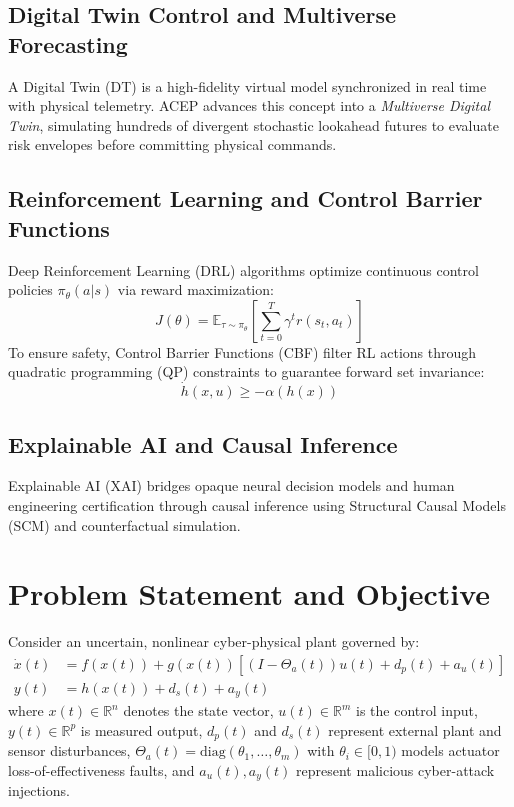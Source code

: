 \documentclass[journal,twocolumn]{IEEEtran}
\begin{document}
\subsection{Digital Twin Control and Multiverse Forecasting}
A Digital Twin (DT) is a high-fidelity virtual model synchronized in real time with physical telemetry. ACEP advances this concept into a \textit{Multiverse Digital Twin}, simulating hundreds of divergent stochastic lookahead futures to evaluate risk envelopes before committing physical commands.

\subsection{Reinforcement Learning and Control Barrier Functions}
Deep Reinforcement Learning (DRL) algorithms optimize continuous control policies $\pi_\theta(a|s)$ via reward maximization:
\begin{equation}
    J(\theta) = \mathbb{E}_{\tau \sim \pi_\theta} \left[ \sum_{t=0}^T \gamma^t r(s_t, a_t) \right]
    \label{eq:rl_obj}
\end{equation}
To ensure safety, Control Barrier Functions (CBF) filter RL actions through quadratic programming (QP) constraints to guarantee forward set invariance:
\begin{equation}
    \dot{h}(x, u) \ge -\alpha(h(x))
    \label{eq:cbf_def}
\end{equation}

\subsection{Explainable AI and Causal Inference}
Explainable AI (XAI) bridges opaque neural decision models and human engineering certification through causal inference using Structural Causal Models (SCM) and counterfactual simulation.

\section{Problem Statement and Objective}
Consider an uncertain, nonlinear cyber-physical plant governed by:
\begin{align}
    \dot{x}(t) &= f(x(t)) + g(x(t)) \left[ (I - \Theta_a(t)) u(t) + d_p(t) + a_u(t) \right] \label{eq:plant_x}\\
    y(t) &= h(x(t)) + d_s(t) + a_y(t) \label{eq:plant_y}
\end{align}
where $x(t) \in \mathbb{R}^n$ denotes the state vector, $u(t) \in \mathbb{R}^m$ is the control input, $y(t) \in \mathbb{R}^p$ is measured output, $d_p(t)$ and $d_s(t)$ represent external plant and sensor disturbances, $\Theta_a(t) = \text{diag}(\theta_1, \dots, \theta_m)$ with $\theta_i \in [0, 1)$ models actuator loss-of-effectiveness faults, and $a_u(t), a_y(t)$ represent malicious cyber-attack injections.
\end{document}
